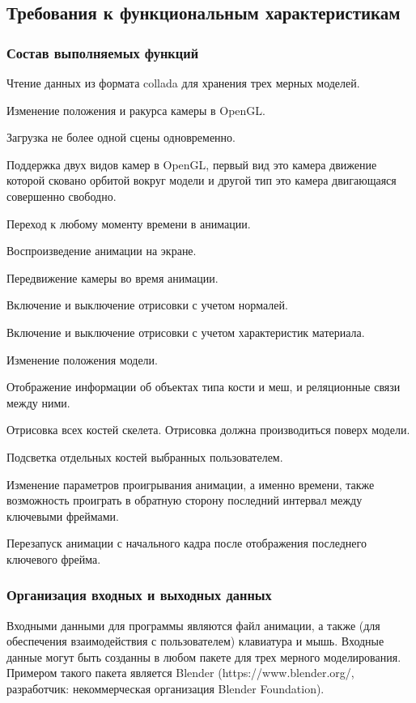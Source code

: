 

\subsection{Требования к функциональным характеристикам}
\subsubsection{Состав выполняемых функций}
\begin{my_enumerate}
\item Чтение данных из формата collada для хранения трех мерных моделей.
\item Изменение положения и ракурса камеры в OpenGL.
\item Загрузка не более одной сцены одновременно.
\item Поддержка двух видов камер в OpenGL, первый вид это камера движение которой сковано орбитой вокруг модели и другой тип это камера двигающаяся совершенно свободно.
\item Переход к любому моменту времени в анимации.
\item Воспроизведение анимации на экране.
\item Передвижение камеры во время анимации.
\item Включение и выключение отрисовки с учетом нормалей.
\item Включение и выключение отрисовки с учетом характеристик материала.
\item Изменение положения модели.
\item Отображение информации об объектах типа кости и меш, и реляционные связи между ними. 
\item Отрисовка всех костей скелета. Отрисовка должна производиться поверх модели.
\item Подсветка отдельных костей выбранных пользователем.
\item Изменение параметров проигрывания анимации, а именно времени, также возможность проиграть в обратную сторону последний интервал между ключевыми фреймами.
\item Перезапуск анимации с начального кадра после отображения последнего ключевого фрейма.
\end{my_enumerate}

\subsubsection{Организация входных и выходных данных}
Входными данными для программы являются файл анимации, а также (для обеспечения взаимодействия с пользователем) клавиатура и мышь. Входные данные могут быть созданны в любом пакете для трех мерного моделирования. Примером такого пакета является Blender (https://www.blender.org/, разработчик: некоммерческая организация Blender Foundation).

